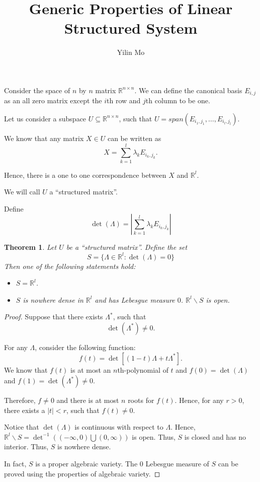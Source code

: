 \documentclass{article}
\title{Generic Properties of Linear Structured System}
\author{Yilin Mo}
\newtheorem{theorem}{Theorem}
\begin{document}
 \maketitle

Consider the space of $n$ by $n$ matrix $\mathbb R^{n\times n}$. We can define the canonical basis $E_{i,j}$ as an all zero matrix except the $i$th row and $j$th column to be one.

Let us consider a subspace $U\subseteq \mathbb R^{n\times n}$, such that $U = span(E_{i_1,j_1},\dots,E_{i_l,j_l})$.

We know that any matrix $X \in U$ can be written as
\begin{displaymath}
  X = \sum_{k=1}^l\lambda_k E_{i_k,j_k}.
\end{displaymath}

Hence, there is a one to one correspondence between $X$ and $\mathbb R^l$.

We will call $U$ a ``structured matrix''.

Define
\begin{displaymath}
 \det(\Lambda) = \left|\sum_{k=1}^l \lambda_k E_{i_k,j_k}\right| 
\end{displaymath}
\begin{theorem}
  Let $U$ be a ``structured matrix''. Define the set
  \begin{displaymath}
    S = \{\Lambda\in \mathbb R^l:\det(\Lambda) =0\} 
  \end{displaymath}
  Then one of the following statements hold:
  \begin{itemize}
    \item $S = \mathbb R^l$.
    \item $S$ is nowhere dense in $\mathbb R^l$ and has Lebesgue measure $0$. $\mathbb R^l \backslash S$ is open.
  \end{itemize}
\end{theorem}
\begin{proof}
  Suppose that there exists $\Lambda^*$, such that
  \begin{displaymath}
    \det\left( \Lambda^* \right) \neq 0. 
  \end{displaymath}

For any $\Lambda $, consider the following function:
\begin{displaymath}
  f(t) = \det\left[ (1-t)\Lambda + t \Lambda^* \right].
\end{displaymath}
We know that $f(t)$ is at most an $n$th-polynomial of $t$ and $f(0) = \det\left( \Lambda \right)$ and $f(1) = \det(\Lambda^*)\neq 0$.

Therefore, $f\neq 0$ and there is at most $n$ roots for $f(t)$. Hence, for any $r > 0$, there exists a $|t| < r$, such that $f(t)\neq 0$.

Notice that $\det(\Lambda)$ is continuous with respect to $\Lambda$. Hence, $\mathbb R^l\backslash S = \det^{-1}((-\infty,0)\bigcup(0,\infty) )$ is open. Thus, $S$ is closed and has no interior. Thus, $S$ is nowhere dense.

In fact, $S$ is a proper algebraic variety. The $0$ Lebesgue measure of $S$ can be proved using the properties of algebraic variety.
\end{proof}
\end{document}
